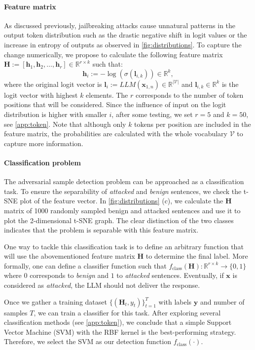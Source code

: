 \paragraph{Feature matrix} 
As discussed previously, jailbreaking attacks cause unnatural patterns in the output token distribution such as the drastic negative shift in logit values or the increase in entropy of outputs as observed in \cref{fig:distributions}. To capture the change numerically, we propose to calculate the following feature matrix $\bm{H}:= \left[ \bm{h}_1, \bm{h}_2,\dots, \bm{h}_r \right] \in \mathbb{R}^{r\times k}$ such that:
\begin{equation}
    \label{eq:h}
     \bm{h}_i := -\log(\sigma(\bm{l}_{i,k}))\in \mathbb{R}^{k},
\end{equation}
where the original logit vector is $\bm{l}_{i} := LLM(\bm{x}_{1,n}) \in \mathbb{R}^{\left | \mathcal{V} \right |}$ and $\bm{l}_{i,k}\in \mathbb{R}^{k}$ is the logit vector with highest $k$ elements. The $r$ corresponds to the number of token positions that will be considered. Since the influence of input on the logit distribution is higher with smaller $i$, after some testing, we set $r=5$ and $k=50$, see \cref{app:token}. Note that although only $k$ tokens per position are included in the feature matrix, the probabilities are calculated with the whole vocabulary $\mathcal{V}$ to capture more information. 

\paragraph{Classification problem}

The adversarial sample detection problem can be approached as a classification task. To ensure the separability of \emph{attacked} and \emph{benign} sentences, we check the t-SNE plot of the feature vector\citep{van2008visualizing}. In \cref{fig:distributions} (c), we calculate the $\bm{H}$ matrix of 1000 randomly sampled benign and attacked sentences and use it to plot the 2-dimensional t-SNE graph. The clear distinction of the two classes indicates that the problem is separable with this feature matrix.

One way to tackle this classification task is to define an arbitrary function that will use the abovementioned feature matrix $\bm{H}$ to determine the final label. More formally, one can define a classifier function such that $f_{\text{class}}(\bm{H}): \mathbb{R}^{r \times k} \rightarrow \{0,1\}$ where $0$ corresponds to \emph{benign} and $1$ to \emph{attacked} sentences. Eventually, if $\bm{x}$ is considered as \emph{attacked}, the LLM should not deliver the response. 

Once we gather a training dataset $\{(\bm{H}_t, y_t)\}_{t=1}^{T}$ with labels $\bm{y}$ and number of samples $T$, we can train a classifier for this task. After exploring several classification methods (see \cref{app:token}), we conclude that a simple Support Vector Machine (SVM) with the RBF kernel \citep{Schölkopf2002kernels} is the best-performing strategy. Therefore, we select the SVM as our detection function  $f_{\text{class}}(\cdot)$. 


